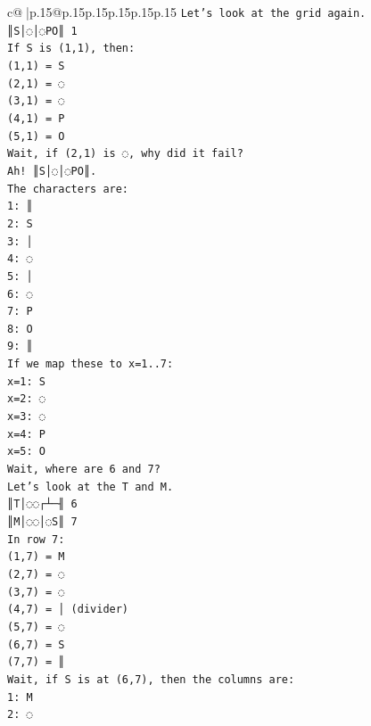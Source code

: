 \documentclass{article}
\begin{document}
{\begin{supertabular}{c@{$\;$}|p{.15\linewidth}@{}p{.15\linewidth}p{.15\linewidth}p{.15\linewidth}p{.15\linewidth}p{.15\linewidth}}
{{{\texttt{Let's look at the grid again.} \\
\texttt{║S│◌│◌PO║ 1} \\
\texttt{If S is (1,1), then:} \\
\texttt{(1,1) = S} \\
\texttt{(2,1) = ◌} \\
\texttt{(3,1) = ◌} \\
\texttt{(4,1) = P} \\
\texttt{(5,1) = O} \\
\texttt{Wait, if (2,1) is ◌, why did it fail?} \\
\texttt{Ah! ║S│◌│◌PO║.} \\
\texttt{The characters are:} \\
\texttt{1: ║} \\
\texttt{2: S} \\
\texttt{3: │} \\
\texttt{4: ◌} \\
\texttt{5: │} \\
\texttt{6: ◌} \\
\texttt{7: P} \\
\texttt{8: O} \\
\texttt{9: ║} \\
\texttt{If we map these to x=1..7:} \\
\texttt{x=1: S} \\
\texttt{x=2: ◌} \\
\texttt{x=3: ◌} \\
\texttt{x=4: P} \\
\texttt{x=5: O} \\
\texttt{Wait, where are 6 and 7?} \\
\texttt{Let's look at the T and M.} \\
\texttt{║T│◌◌┌┴─╢ 6} \\
\texttt{║M│◌◌│◌S║ 7} \\
\texttt{In row 7:} \\
\texttt{(1,7) = M} \\
\texttt{(2,7) = ◌} \\
\texttt{(3,7) = ◌} \\
\texttt{(4,7) = │ (divider)} \\
\texttt{(5,7) = ◌} \\
\texttt{(6,7) = S} \\
\texttt{(7,7) = ║} \\
\texttt{Wait, if S is at (6,7), then the columns are:} \\
\texttt{1: M} \\
\texttt{2: ◌} \\
}}}
\end{supertabular}}
\end{document}
